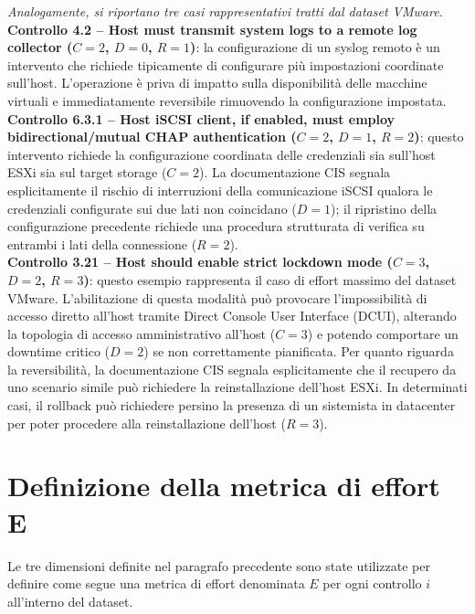 \documentclass[a4paper,11pt]{report}
\begin{document}
\textit{Analogamente, si riportano tre casi rappresentativi tratti dal dataset VMware.} \\


\textbf{Controllo 4.2 -- Host must transmit system logs to a remote log collector ($C=2$, $D=0$, $R=1$)}: la configurazione di un syslog remoto è un intervento che richiede tipicamente di configurare più impostazioni coordinate sull'host. L'operazione è priva di impatto sulla disponibilità delle macchine virtuali e immediatamente reversibile rimuovendo la configurazione impostata. \\

\textbf{Controllo 6.3.1 -- Host iSCSI client, if enabled, must employ bidirectional/mutual CHAP authentication ($C=2$, $D=1$, $R=2$)}: questo intervento richiede la configurazione coordinata delle credenziali sia sull'host ESXi sia sul target storage ($C=2$). La documentazione CIS segnala esplicitamente il rischio di interruzioni della comunicazione iSCSI qualora le credenziali configurate sui due lati non coincidano ($D=1$); il ripristino della configurazione precedente richiede una procedura strutturata di verifica su entrambi i lati della connessione ($R=2$). \\

\textbf{Controllo 3.21 -- Host should enable strict lockdown mode ($C=3$, $D=2$, $R=3$)}: questo esempio rappresenta il caso di effort massimo del dataset VMware. L'abilitazione di questa modalità può provocare l'impossibilità di accesso diretto all'host tramite Direct Console User Interface (DCUI), alterando la topologia di accesso amministrativo all'host ($C=3$) e potendo comportare un downtime critico ($D=2$) se non correttamente pianificata. Per quanto riguarda la reversibilità, la documentazione CIS segnala esplicitamente che il recupero da uno scenario simile può richiedere la reinstallazione dell'host ESXi. In determinati casi, il rollback può richiedere persino la presenza di un sistemista in datacenter per poter procedere alla reinstallazione dell'host ($R=3$).


\section{Definizione della metrica di effort E}


Le tre dimensioni definite nel paragrafo precedente sono state utilizzate per definire come segue una metrica di effort denominata $E$ per ogni controllo $i$ all'interno del dataset. \\
\end{document}
